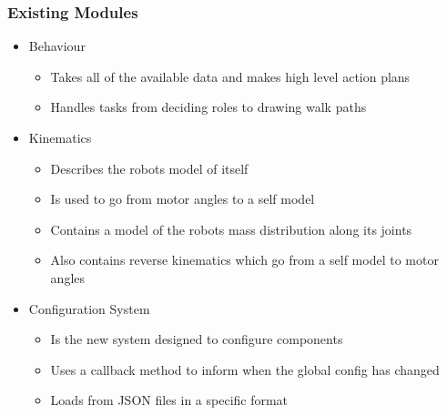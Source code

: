 \documentclass{beamer}
\begin{document}
\begin{frame}
	\frametitle{Existing Modules}
	\begin{itemize}
		\item Behaviour
			\begin{itemize}
				\item Takes all of the available data and makes high level action plans
				\item Handles tasks from deciding roles to drawing walk paths
			\end{itemize}
		\item Kinematics
			\begin{itemize}
				\item Describes the robots model of itself
				\item Is used to go from motor angles to a self model
				\item Contains a model of the robots mass distribution along its joints
				\item Also contains reverse kinematics which go from a self model to motor angles
			\end{itemize}
		\item Configuration System
			\begin{itemize}
				\item Is the new system designed to configure components
				\item Uses a callback method to inform when the global config has changed
				\item Loads from JSON files in a specific format
			\end{itemize}
	\end{itemize}
\end{frame}
\end{document}
